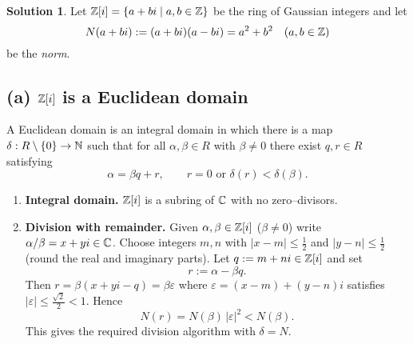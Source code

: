 \documentclass[12pt]{article}
\theoremstyle{definition} %
\newtheorem{solution}{Solution}
\theoremstyle{plain} %
\begin{document}
                    \begin{solution}
                      Let $\Bbb Z[i]=\{a+bi\mid a,b\in\Bbb Z\}$ be the ring of Gaussian integers
                      and let 
                      \[
                           N(a+bi):=(a+bi)(a-bi)=a^{2}+b^{2}\quad(a,b\in\Bbb Z)
                      \]
                      be the \emph{norm}.
                      
                      \subsection*{(a)  $\Bbb Z[i]$ is a Euclidean domain}
                      
                      A Euclidean domain is an integral domain in which there is a map
                      $\delta:R\setminus\{0\}\to\Bbb N$ such that for all
                      $\alpha,\beta\in R$ with $\beta\ne 0$ there exist
                      $q,r\in R$ satisfying 
                      \[
                              \alpha=\beta q+r,
                              \qquad
                              r=0\text{ or }\delta(r)<\delta(\beta).
                      \]
                      
                      \begin{enumerate}[label=\textit{Step \arabic*:},wide, labelwidth=0pt,labelsep=.8em]
                          \item\textbf{Integral domain.}\;
                                $\Bbb Z[i]$ is a subring of $\Bbb C$ with no zero–divisors.
                      
                          \item\textbf{Division with remainder.}\;
                                Given $\alpha,\beta\in\Bbb Z[i]$ ($\beta\ne 0$) write
                                $\alpha/\beta = x+yi\in\Bbb C$.
                                Choose integers $m,n$ with 
                                $\bigl|x-m\bigr|\le\frac12$ and $\bigl|y-n\bigr|\le\frac12$
                                (round the real and imaginary parts).
                                Let $q:=m+ni\in\Bbb Z[i]$ and set
                                \[
                                      r:=\alpha-\beta q.
                                \]
                                Then 
                                \(
                                      r = \beta(x+yi-q) = \beta\varepsilon
                                \)
                                where $\varepsilon=(x-m)+(y-n)i$ satisfies
                                $|\varepsilon|\le\frac{\sqrt{2}}{2}<1$.  Hence
                                \[
                                       N(r)=N(\beta)\,|\varepsilon|^{2}
                                               < N(\beta).
                                \]
                                This gives the required division algorithm with $\delta=N$.
                      

\end{enumerate}
\end{solution}
\end{document}
